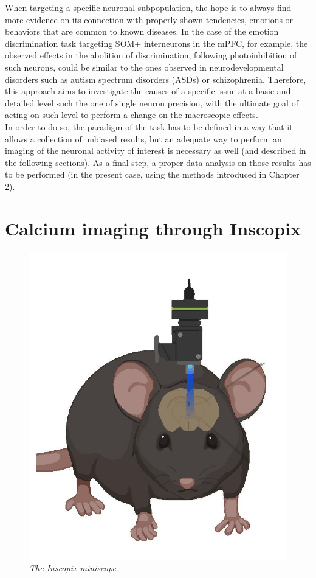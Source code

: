 \documentclass[12pt, a4paper]{report}
\begin{document}
When targeting a specific neuronal subpopulation, the hope is to always find  more evidence on its connection with  properly shown tendencies, emotions or behaviors that are common to known diseases. In the case of the emotion discrimination task targeting SOM+ interneurons in the mPFC, for example, the observed effects in the abolition of discrimination, following photoinhibition of such neurons, could be similar to the ones observed in neurodevelopmental disorders such as autism spectrum disorders (ASDs) or schizophrenia. Therefore, this approach aims to investigate the causes of a specific issue at a basic and detailed level such the one of single neuron precision, with the ultimate goal of acting on such level to perform a change on the macroscopic effects.\\
In order to do so, the paradigm of the task has to be defined in a way that it allows a collection of unbiased results, but an adequate way to perform an imaging of the neuronal activity of interest is necessary as well (and described in the following sections). As a final step, a proper data analysis on those results has to be performed (in the present case, using the methods introduced in Chapter 2).


\section{Calcium imaging through Inscopix} \label{section 1.3}



\begin{figure}[H]
	\begin{center}
		\includegraphics[scale=.35]{Inscopix.jpg} 
	\end{center} 
	\caption{\textit{The Inscopix miniscope}}
	
\end{figure}
\end{document}
